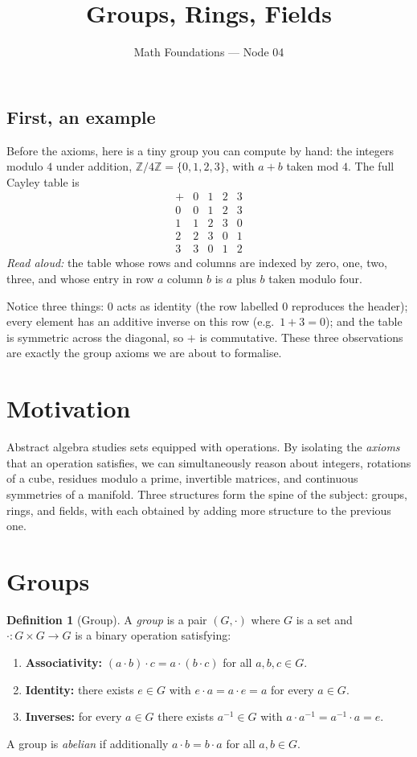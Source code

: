 \documentclass[11pt]{article}
\title{Groups, Rings, Fields}
\author{Math Foundations --- Node 04}
\date{}
\theoremstyle{definition}
\newtheorem{definition}{Definition}
\begin{document}
\maketitle

\subsection*{First, an example}
Before the axioms, here is a tiny group you can compute by hand: the integers
modulo $4$ under addition, $\mathbb{Z}/4\mathbb{Z} = \{0, 1, 2, 3\}$, with
$a + b$ taken mod $4$. The full Cayley table is
\[
\begin{array}{c|cccc}
+ & 0 & 1 & 2 & 3 \\ \hline
0 & 0 & 1 & 2 & 3 \\
1 & 1 & 2 & 3 & 0 \\
2 & 2 & 3 & 0 & 1 \\
3 & 3 & 0 & 1 & 2
\end{array}
\]
\emph{Read aloud:} the table whose rows and columns are indexed by zero, one,
two, three, and whose entry in row $a$ column $b$ is $a$ plus $b$ taken modulo
four.

Notice three things: $0$ acts as identity (the row labelled $0$ reproduces the
header); every element has an additive inverse on this row (e.g.\ $1 + 3 = 0$);
and the table is symmetric across the diagonal, so $+$ is commutative. These
three observations are exactly the group axioms we are about to formalise.

\section{Motivation}

Abstract algebra studies sets equipped with operations. By isolating the
\emph{axioms} that an operation satisfies, we can simultaneously reason about
integers, rotations of a cube, residues modulo a prime, invertible matrices,
and continuous symmetries of a manifold. Three structures form the spine of
the subject: groups, rings, and fields, with each obtained by adding more
structure to the previous one.

\section{Groups}

\begin{definition}[Group]
A \emph{group} is a pair $(G, \cdot)$ where $G$ is a set and
$\cdot : G \times G \to G$ is a binary operation satisfying:
\begin{enumerate}
  \item \textbf{Associativity:} $(a \cdot b) \cdot c = a \cdot (b \cdot c)$
        for all $a, b, c \in G$.
  \item \textbf{Identity:} there exists $e \in G$ with
        $e \cdot a = a \cdot e = a$ for every $a \in G$.
  \item \textbf{Inverses:} for every $a \in G$ there exists $a^{-1} \in G$
        with $a \cdot a^{-1} = a^{-1} \cdot a = e$.
\end{enumerate}
A group is \emph{abelian} if additionally $a \cdot b = b \cdot a$ for all
$a, b \in G$.
\end{definition}
\end{document}
